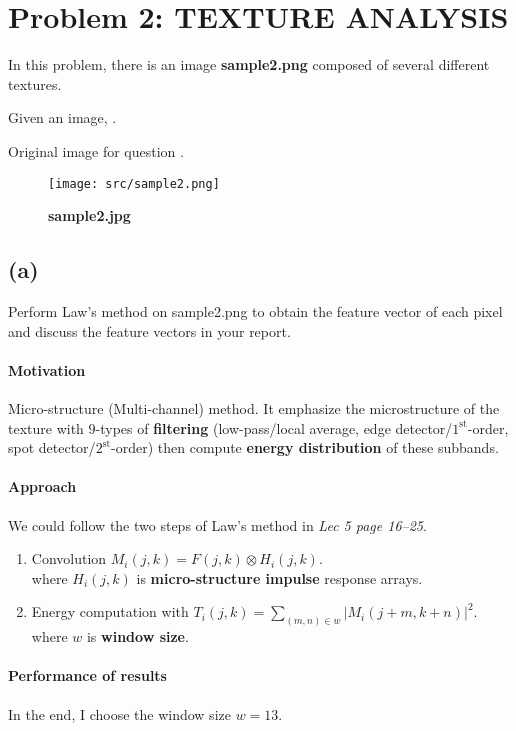 \newpage
\section{Problem 2: TEXTURE ANALYSIS}\label{problem-2-texture-analysis}
In this problem, there is an image \textbf{sample2.png} composed of several different textures.

Given an image, .

Original image  for question .
\begin{figure}
    \centering
    \texttt{[image: src/sample2.png]}
    \caption{\textbf{sample2.jpg}}
    \label{sample2}
\end{figure}

\subsection{(a)}\label{2_a}
Perform Law’s method on sample2.png to obtain the feature vector of each pixel and discuss the feature vectors in your report.

\paragraph{Motivation}
Micro-structure (Multi-channel) method. It emphasize the microstructure of the texture with \(9\)-types of \textbf{filtering} (low-pass/local average, edge detector/\(1^{\mbox{st}}\)-order, spot detector/\(2^{\mbox{st}}\)-order) then compute \textbf{energy distribution} of these subbands.

\paragraph{Approach}
We could follow the two steps of Law's method in \textit{Lec 5 page 16--25}.

\begin{enumerate}
    \item Convolution \(M_{i}(j, k) = F(j, k) \otimes H_{i}(j, k) \). \\
	where \(H_{i}(j, k)\) is \textbf{micro-structure impulse} response arrays.
    \item Energy computation with \(T_{i}(j, k) = \sum_{(m, n) \in w} |M_{i}(j+m, k+n) |^{2} \). \\
	where \(w\) is \textbf{window size}.
\end{enumerate}

\paragraph{Performance of results}
In the end, I choose the window size \(w = 13\).

